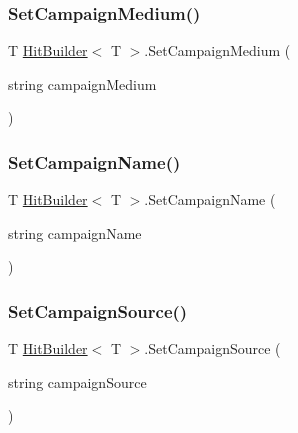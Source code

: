 \mbox{\label{class_hit_builder_a6057460657162ac72cc0412a218c6018}} 
\subsubsection{\texorpdfstring{Set\+Campaign\+Medium()}{SetCampaignMedium()}}
{\footnotesize\ttfamily T \hyperlink{class_hit_builder}{Hit\+Builder}$<$ T $>$.Set\+Campaign\+Medium (\begin{DoxyParamCaption}\item[{string}]{campaign\+Medium }\end{DoxyParamCaption})}

\mbox{\label{class_hit_builder_a5079f79a4c1758aa82b85786d9600e1b}} 
\subsubsection{\texorpdfstring{Set\+Campaign\+Name()}{SetCampaignName()}}
{\footnotesize\ttfamily T \hyperlink{class_hit_builder}{Hit\+Builder}$<$ T $>$.Set\+Campaign\+Name (\begin{DoxyParamCaption}\item[{string}]{campaign\+Name }\end{DoxyParamCaption})}

\mbox{\label{class_hit_builder_acd475a4aaf0249b408d80fa454f27a52}} 
\subsubsection{\texorpdfstring{Set\+Campaign\+Source()}{SetCampaignSource()}}
{\footnotesize\ttfamily T \hyperlink{class_hit_builder}{Hit\+Builder}$<$ T $>$.Set\+Campaign\+Source (\begin{DoxyParamCaption}\item[{string}]{campaign\+Source }\end{DoxyParamCaption})}

